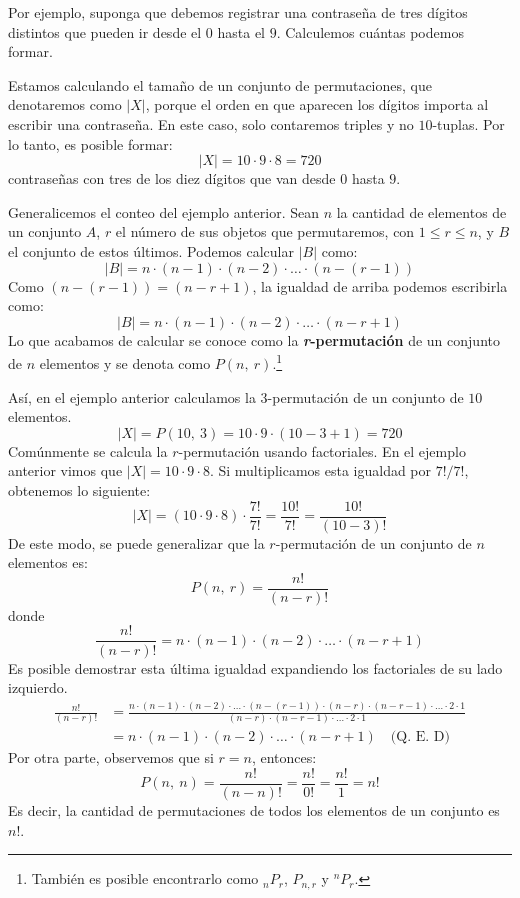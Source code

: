 \documentclass[12pt]{article}
\begin{document}
Por ejemplo, suponga que debemos registrar una contraseña de tres dígitos distintos que pueden ir desde el $0$ hasta el $9$. Calculemos cuántas podemos formar.

Estamos calculando el tamaño de un conjunto de permutaciones, que denotaremos como $|X|$, porque el orden en que aparecen los dígitos importa al escribir una contraseña. En este caso, solo contaremos triples y no $10$-tuplas. Por lo tanto, es posible formar:
\[
  |X| = 10 \cdot 9 \cdot 8 = 720
\]
contraseñas con tres de los diez dígitos que van desde $0$ hasta $9$.

Generalicemos el conteo del ejemplo anterior. Sean $n$ la cantidad de elementos de un conjunto $A$, $r$ el número de sus objetos que permutaremos, con $1 \leq r \leq n$, y $B$ el conjunto de estos últimos. Podemos calcular $|B|$ como:
\[
  |B| = n \cdot (n - 1) \cdot (n - 2) \cdot \ldots \cdot (n - (r - 1))
\]
Como $(n - (r - 1)) = (n - r + 1)$, la igualdad de arriba podemos escribirla como:
\[
  |B| = n \cdot (n - 1) \cdot (n - 2) \cdot \ldots \cdot (n - r + 1)
\]
Lo que acabamos de calcular se conoce como la \textbf{\textit{r}-permutación} de un conjunto de $n$ elementos y se denota como $P(n, \ r)$.\footnote{También es posible encontrarlo como ${}_{n}P_{r}$, $P_{n, r}$ y ${}^{n}P_{r}$.}

Así, en el ejemplo anterior calculamos la $3$-permutación de un conjunto de $10$ elementos.
\[
  |X| = P(10, \ 3) = 10 \cdot 9 \cdot (10 - 3 + 1) = 720
\]
Comúnmente se calcula la $r$-permutación usando factoriales. En el ejemplo anterior vimos que $|X| = 10 \cdot 9 \cdot 8$. Si multiplicamos esta igualdad por $7!/7!$, obtenemos lo siguiente:
\[
  |X| = (10 \cdot 9 \cdot 8) \cdot \frac{7!}{7!}
      = \frac{10!}{7!}
      = \frac{10!}{(10 - 3)!}
\]
De este modo, se puede generalizar que la $r$-permutación de un conjunto de $n$ elementos es:
\[
  P(n, \ r) = \frac{n!}{(n - r)!}
\]
donde
\[
  \frac{n!}{(n - r)!} = n \cdot (n - 1) \cdot (n - 2) \cdot \ldots \cdot (n - r + 1)
\]
Es posible demostrar esta última igualdad expandiendo los factoriales de su lado izquierdo.
\begin{align*}
  \frac{n!}{(n - r)!} &= \frac{n \cdot (n - 1) \cdot (n - 2) \cdot \ldots \cdot (n - (r - 1)) \cdot (n - r) \cdot (n - r - 1) \cdot \ldots \cdot 2 \cdot 1}
                             {(n - r) \cdot (n - r - 1) \cdot \ldots \cdot 2 \cdot 1} \\
                      &= n \cdot (n - 1) \cdot (n - 2) \cdot \ldots \cdot (n - r + 1) \quad \text{(Q. E. D)}
\end{align*}
Por otra parte, observemos que si $r = n$, entonces:
\[
  P(n, \ n) = \frac{n!}{(n - n)!} = \frac{n!}{0!} = \frac{n!}{1} = n!
\]
Es decir, la cantidad de permutaciones de todos los elementos de un conjunto es $n!$.
\end{document}
